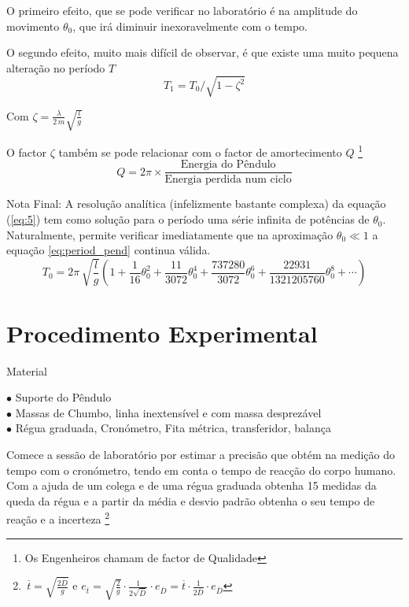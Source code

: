 \documentclass[a4paper,twoside,12pt]{article}      %
\begin{document}
O primeiro efeito, que se pode verificar no laboratório é na amplitude do movimento $\theta_0$, que irá diminuir inexoravelmente com o tempo. 

O segundo efeito, muito mais difícil de observar, é que existe uma muito pequena alteração no período $T$
\begin{equation}
T_1= T_0 / \sqrt{1 - \zeta^2} 
\end{equation}

Com $ \zeta = \frac{\lambda}{2\, m} \sqrt{\frac{l}{g}}  $

O factor  $ \zeta $ também se pode relacionar com o factor de amortecimento $Q$ \footnote{Os Engenheiros chamam de factor de Qualidade} 
\begin{equation}
Q = 2 \pi \times \frac{\text{Energia do Pêndulo}}{\text{Energia perdida num ciclo}}
\end{equation}

Nota Final: A resolução analítica (infelizmente bastante complexa) da equação 	(\ref{eq:5})  tem como solução para o período uma série  infinita de potências de $\theta_0$. 
Naturalmente, permite verificar imediatamente que na aproximação $\theta_0 \ll 1$ a equação \ref{eq:period_pend} continua válida.
\begin{equation}
	\label{eq:period_pend_exa}
T_0 =  2\pi\, \sqrt{\frac{l}{g}} \left(1 + \frac{1}{16} \theta_0^{2} + \frac{11}{3072} \theta_0^{4} +
 \frac{737280}{3072} \theta_0^{6} + \frac{22931}{1321205760} \theta_0^{8} + \cdots \right)
\end{equation}

\newpage
\section{\sf Procedimento Experimental}
{ \large Material }
 \begin{flushleft}
	 $\bullet$ Suporte do Pêndulo \\
	 $\bullet$ Massas de Chumbo, linha inextensível e com massa desprezável \\
	 $\bullet$ Régua graduada, Cronómetro, Fita métrica, transferidor, balança
\end{flushleft} 

Comece a sessão de laboratório por estimar a precisão que obtém na medição do tempo com o cronómetro, tendo em conta 
o tempo de reacção do corpo humano. 
Com a ajuda de um colega e de uma régua graduada obtenha 15 medidas da queda da régua e a partir da média e desvio padrão obtenha o seu tempo de reação e a incerteza \footnote{ $\,\overline{t}=\sqrt{\frac{2 \overline{D}}{g}}$ e   
$e_{\overline{t}}=\sqrt{\frac{2 }{g}} \cdot \frac{1}{2\sqrt{\overline{D}}} \cdot e_{\overline{D}}  
= \overline{t} \cdot \frac{1}{2\overline{D}} \cdot e_{\overline{D}} $ }
\end{document}
